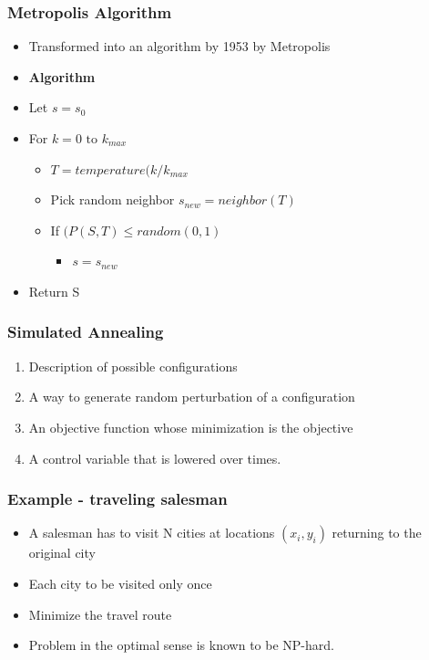 \documentclass[10pt]{beamer}
\newcommand{\myemph}[1]{{\usebeamercolor[fg]{emphprimary}
    \textbf{#1}}}
\begin{document}
\begin{frame}
  \frametitle{Metropolis Algorithm}
  \begin{itemize}
  \item Transformed into an algorithm by 1953 by Metropolis
  \item \myemph{Algorithm}
  \item Let $s= s_0$
  \item For $k=0 \mbox{ to } k_{max}$
    \begin{itemize}
    \item $T = temperature (k/k_{max}$
    \item Pick random neighbor $s_{new} = neighbor(T)$
    \item If $(P(S,T) \leq random(0,1)$
      \begin{itemize}
      \item $s = s_{new}$        
      \end{itemize}
    \end{itemize}
  \item Return S
  \end{itemize}
\end{frame}

\begin{frame}
  \frametitle{Simulated Annealing}
  \begin{enumerate}
  \item Description of possible configurations
  \item A way to generate random perturbation of a configuration
  \item An objective function whose minimization is the objective
  \item A control variable that is lowered over times. 
  \end{enumerate}
\end{frame}

\begin{frame}
  \frametitle{Example - traveling salesman}
  \begin{itemize}
  \item A salesman has to visit N cities at locations $(x_i, y_i)$
    returning to the original city
  \item Each city to be visited only once
  \item Minimize the travel route
  \item Problem in the optimal sense is known to be NP-hard. 
  \end{itemize}
\end{frame}
\end{document}
